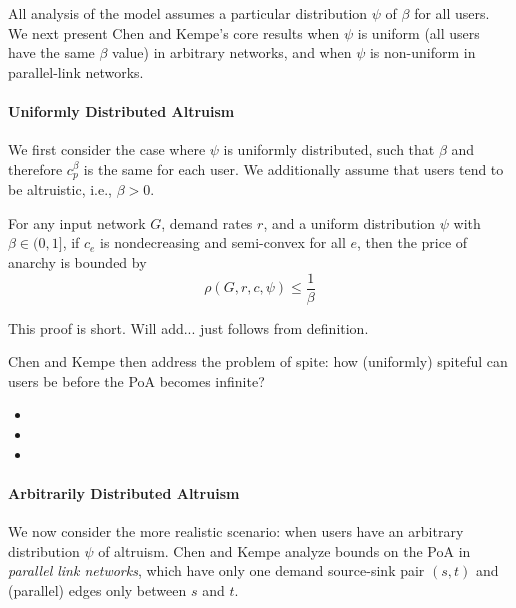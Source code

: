 All analysis of the model assumes a particular distribution $\psi$ of $\beta$ for all users. We next present Chen and Kempe's core results when $\psi$ is uniform (all users have the same $\beta$ value) in arbitrary networks, and when $\psi$ is non-uniform in parallel-link networks.


\paragraph{Uniformly Distributed Altruism}
We first consider the case where $\psi$ is uniformly distributed, such that $\beta$ and therefore $c^\beta_p$ is the same for each user. We additionally assume that users tend to be altruistic, i.e., $\beta > 0$.
\begin{theorem}
For any input network $G$, demand rates $r$, and 
a uniform distribution $\psi$ with $\beta \in (0, 1]$,
if $c_e$ is nondecreasing and semi-convex for all $e$,
    then the price of anarchy is bounded by 
    $$\rho(G,r,c,\psi) \le \frac{1}{\beta}$$
\end{theorem}

\begin{proof-sketch}
This proof is short. Will add... just follows from definition.
\end{proof-sketch}

Chen and Kempe then address the problem of spite: how (uniformly) spiteful can users be before the PoA becomes infinite?
\begin{itemize}
\item{}
\item{}
\item{}
\end{itemize}

\paragraph{Arbitrarily Distributed Altruism}
We now consider the more realistic scenario: when users have an arbitrary distribution $\psi$ of altruism.
Chen and Kempe analyze bounds on the PoA in \emph{parallel link networks}, which have 
only one demand source-sink pair $(s,t)$ and (parallel) edges only between $s$ and $t$.

